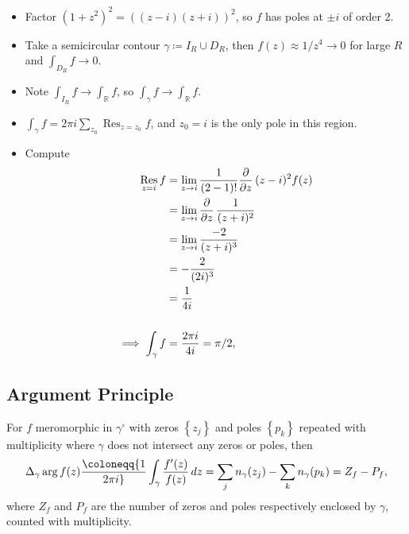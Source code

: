 \begin{solution}

\envlist

\begin{itemize}
\tightlist
\item
  Factor \((1+z^2)^2 = ((z-i)(z+i))^2\), so \(f\) has poles at \(\pm i\)
  of order 2.
\item
  Take a semicircular contour \(\gamma \coloneqq I_R \cup D_R\), then
  \(f(z) \approx 1/z^4 \to 0\) for large \(R\) and
  \(\int_{D_R} f \to 0\).
\item
  Note \(\int_{I_R} f \to \int_{\mathbb{R}}f\), so
  \(\int_\gamma f \to \int_{\mathbb{R}}f\).
\item
  \(\int_\gamma f = 2\pi i \sum_{z_0} \mathop{\mathrm{Res}}_{z=z_0} f\),
  and \(z_0 = i\) is the only pole in this region.
\item
  Compute
  \begin{align*}
  \mathop{\mathrm{Res}}_{z=i} f 
  &= \lim_{z\to i} {1\over (2-1)!} {\frac{\partial }{\partial z}\,} (z-i)^2 f(z) \\
  &= \lim_{z\to i} {\frac{\partial }{\partial z}\,} {1\over (z+i)^2 } \\
  &= \lim_{z\to i} {-2 \over (z+i)^3 } \\
  &= -{2 \over (2i)^3 } \\
  &= {1\over 4i} \\ \\
  \implies
  \int_\gamma f &= {2\pi i \over 4i} = \pi/2
  ,\end{align*}
\end{itemize}

\end{solution}

\hypertarget{argument-principle}{%
\subsection{Argument Principle}\label{argument-principle}}

\begin{theorem}

For \(f\) meromorphic in \(\gamma^\circ\) with zeros
\(\left\{{ z_j }\right\}\) and poles \(\left\{{ p_k }\right\}\) repeated
with multiplicity where \(\gamma\) does not intersect any zeros or
poles, then
\begin{align*}  
\Delta_\gamma \arg f(z) \coloneqq{1\over 2\pi i} \int_\gamma {f'(z) \over f(z)} \,dz= \sum_{j} n_\gamma(z_j) - \sum_k n_\gamma(p_k) = Z_f - P_f
,\end{align*}
where \(Z_f\) and \(P_f\) are the number of zeros and poles respectively
enclosed by \(\gamma\), counted with multiplicity.

\end{theorem}

